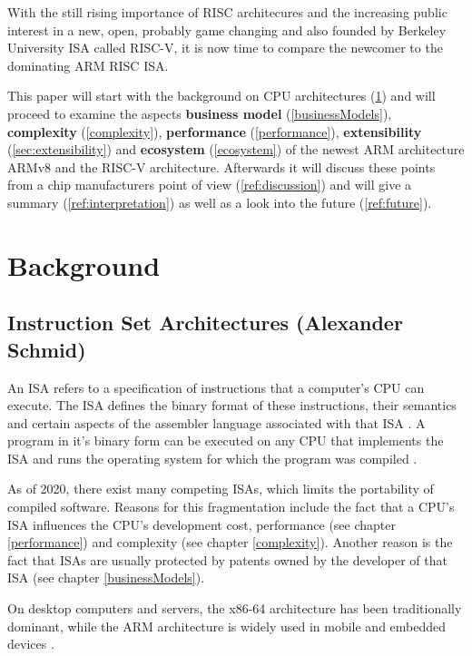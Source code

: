 \documentclass[conference]{IEEEtran}
\begin{document}
	With the still rising importance of \gls{RISC} architecures and the increasing public interest in a new, open, probably game changing and also founded by Berkeley University \gls{ISA} called RISC-V, it is now  time to compare the newcomer to the dominating ARM \gls{RISC} \gls{ISA}.

	This paper will start with the background on \gls{CPU} architectures (\ref{ref:background}) and will proceed to examine the aspects \textbf{business model} (\ref{businessModels}), \textbf{complexity} (\ref{complexity}), \textbf{performance} (\ref{performance}), \textbf{extensibility} (\ref{sec:extensibility}) and \textbf{ecosystem} (\ref{ecosystem}) of the newest ARM architecture ARMv8 and the RISC-V architecture. Afterwards it will discuss these points from a chip manufacturers point of view (\ref{ref:discussion}) and will give a summary (\ref{ref:interpretation}) as well as a look into the future (\ref{ref:future}).

\section{Background}
\label{ref:background}
	\subsection{Instruction Set Architectures (Alexander Schmid)}
	An \gls{ISA} refers to a specification of instructions that a computer's \gls{CPU} can execute.
	The \gls{ISA} defines the binary format of these instructions, their semantics and certain aspects of the assembler
	language associated with that \gls{ISA} \cite[page 20-23]{Stokes2006}.
	A program in it's binary form can be executed on any \gls{CPU} that implements the \gls{ISA} and runs the operating system
	for which the program was compiled \cite[page 71]{Stokes2006}.

	As of 2020, there exist many competing \glspl{ISA}, which limits the portability of compiled software.
	Reasons for this fragmentation include the fact that a \gls{CPU}'s \gls{ISA} influences the \gls{CPU}'s development cost, performance (see chapter \ref{performance})
	and complexity (see chapter \ref{complexity}). Another reason is the fact that \glspl{ISA} are usually protected by patents owned by the developer of that \gls{ISA} (see chapter \ref{businessModels}).

	On desktop computers and servers, the x86-64 architecture has been traditionally dominant,
	while the ARM architecture is widely used in mobile and embedded devices \cite{Blem2013}.
\end{document}
